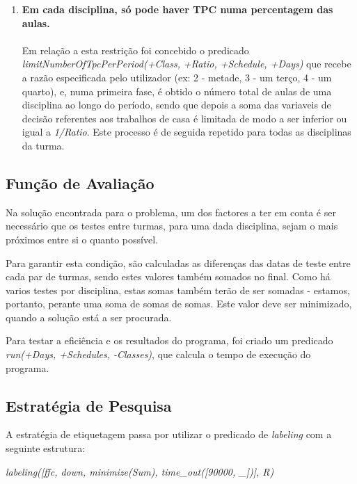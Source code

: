 \documentclass{llncs}
\begin{document}
\begin{enumerate}
	\item \textbf{Em cada disciplina, só pode haver TPC numa percentagem das aulas.} \\\\
		Em relação a esta restrição foi concebido o predicado  \textit{limitNumberOfTpcPerPeriod(+Class, +Ratio, +Schedule, +Days)} que recebe a razão especificada pelo utilizador (ex: 2 - metade, 3 - um terço, 4 - um 
		quarto), e, numa primeira fase, é obtido o número total de aulas de uma disciplina ao longo do período, sendo que depois a soma das variaveis de decisão referentes aos trabalhos de casa é limitada de modo a ser 
		inferior ou igual a  \textit{1/Ratio}. Este processo é de seguida repetido para todas as disciplinas da turma.
	 	\\

	\end{enumerate}
		
	
	
 
 

\subsection{Função de Avaliação}
Na solução encontrada para o problema, um dos factores a ter em conta é ser necessário que os testes entre turmas, para uma dada disciplina, sejam o mais próximos entre si o quanto possível. \par
Para garantir esta condição, são calculadas as diferenças das datas de teste entre cada par de turmas, sendo estes valores também somados no final. Como há varios testes por disciplina, estas somas também terão de ser somadas - estamos, portanto, perante uma soma de somas de somas. Este valor deve ser minimizado, quando a solução está a ser procurada.\par
Para testar a eficiência e os resultados do programa, foi criado um predicado \textit{run(+Days, +Schedules, -Classes)}, que calcula o tempo de execução do programa.

\subsection{Estratégia de Pesquisa}
A estratégia de etiquetagem passa por utilizar o predicado de \textit{labeling} com a seguinte estrutura:\newline\newline
\centerline{\textit{labeling([ffc, down, minimize(Sum), time\_out([90000, \_])], R)}}\newline
 
\end{document}
